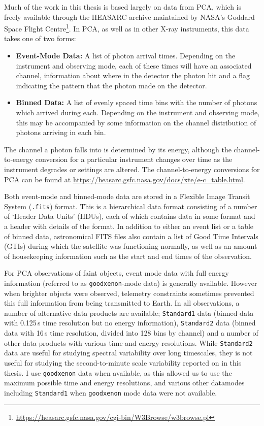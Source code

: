 \par Much of the work in this thesis is based largely on data from PCA, which is freely available through the HEASARC archive maintained by NASA's Goddard Space Flight Centre\footnote{\url{https://heasarc.gsfc.nasa.gov/cgi-bin/W3Browse/w3browse.pl}}.  In PCA, as well as in other X-ray instruments, this data takes one of two forms:
\begin{itemize}
\item \textbf{Event-Mode Data:} A list of photon arrival times.  Depending on the instrument and observing mode, each of these times will have an associated channel, information about where in the detector the photon hit and a flag indicating the pattern that the photon made on the detector.
\item \textbf{Binned Data:} A list of evenly spaced time bins with the number of photons which arrived during each.  Depending on the instrument and observing mode, this may be accompanied by some information on the channel distribution of photons arriving in each bin.
\end{itemize}
\par The channel a photon falls into is determined by its energy, although the channel-to-energy conversion for a particular instrument changes over time as the instrument degrades or settings are altered.  The channel-to-energy conversions for PCA can be found at \url{https://heasarc.gsfc.nasa.gov/docs/xte/e-c_table.html}.
\par Both event-mode and binned-mode data are stored in a Flexible Image Transit System (\texttt{.fits}) format.  This is a hierarchical data format consisting of a number of `Header Data Units' (HDUs), each of which contains data in some format and a header with details of the format.  In addition to either an event list or a table of binned data, astronomical FITS files also contain a list of Good Time Intervals (GTIs) during which the satellite was functioning normally, as well as an amount of housekeeping information such as the start and end times of the observation.
\par For PCA observations of faint objects, event mode data with full energy information (referred to as \texttt{goodxenon}-mode data) is generally available.  However when brighter objects were observed, telemetry constraints sometimes prevented this full information from being transmitted to Earth.  In all observations, a number of alternative data products are available; \texttt{Standard1} data (binned data with 0.125\,s time resolution but no energy information), \texttt{Standard2} data (binned data with 16\,s time resolution, divided into 128 bins by channel) and a number of other data products with various time and energy resolutions.  While \texttt{Standard2} data are useful for studying spectral variability over long timescales, they is not useful for studying the second-to-minute scale variability reported on in this thesis.  I use \texttt{goodxenon} data when available, as this allowed us to use the maximum possible time and energy resolutions, and various other datamodes including \texttt{Standard1} when \texttt{goodxenon} mode data were not available.

